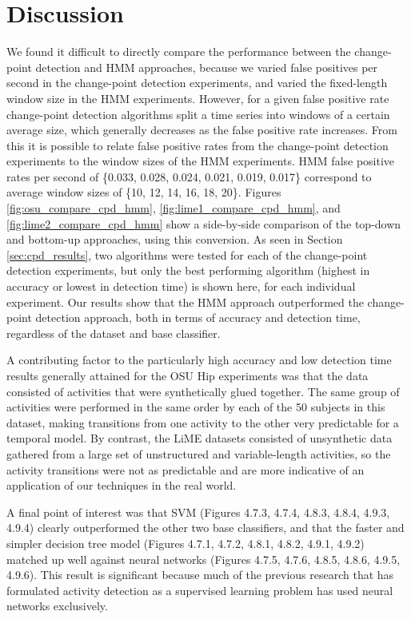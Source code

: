 \newpage

\section{Discussion}

We found it difficult to directly compare the performance between the change-
point detection and HMM approaches, because we
varied false positives per second in the change-point detection experiments,
and varied the fixed-length window size in the HMM experiments.
However, for a given false positive rate change-point
detection algorithms split a time series into windows of a certain average size,
which generally decreases as the false positive rate increases. From this it is possible
to relate false positive rates from the change-point detection experiments to
the window sizes of the HMM experiments. HMM false positive rates per second of
\{0.033, 0.028, 0.024, 0.021, 0.019, 0.017\} correspond to average
window sizes of \{10, 12, 14, 16, 18, 20\}. Figures \ref{fig:osu_compare_cpd_hmm},
\ref{fig:lime1_compare_cpd_hmm}, and \ref{fig:lime2_compare_cpd_hmm}
show a side-by-side comparison of the top-down and bottom-up approaches, using
this conversion. As seen in Section \ref{sec:cpd_results}, two algorithms 
were tested for each of the change-point detection experiments, but only the
best performing algorithm (highest in accuracy or lowest in detection time) is 
shown here, for each individual experiment.
Our results show that the HMM approach outperformed the change-point
detection approach, both in terms of accuracy
and detection time, regardless of the dataset and base classifier.

A contributing factor to the particularly high accuracy and low detection time
results generally attained for the OSU Hip experiments was that the data
consisted of activities that were synthetically glued together. The same group
of activities were performed in the same order by each of the 50 subjects in
this dataset, making transitions from one activity to the other very predictable
for a temporal model. By contrast, the LiME datasets consisted of unsynthetic
data gathered from a large set of unstructured and variable-length activities,
so the activity transitions were not as predictable and are more indicative of
an application of our techniques in the real world.

A final point of interest was that SVM (Figures 4.7.3, 4.7.4, 4.8.3, 4.8.4, 4.9.3, 4.9.4) clearly outperformed the other two
base classifiers, and that the faster and simpler decision tree model (Figures 4.7.1, 4.7.2, 4.8.1, 4.8.2, 4.9.1, 4.9.2) matched up
well against neural networks (Figures 4.7.5, 4.7.6, 4.8.5, 4.8.6, 4.9.5, 4.9.6). This result is significant because much of the
previous research that has formulated activity detection as a supervised learning
problem has used neural networks exclusively.

